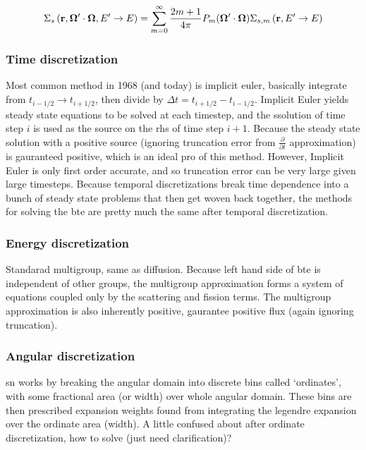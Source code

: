 \begin{equation}
    \label{eq:sigmas_expansion}
    \Sigma_{s}\left(\mathbf{r}, \bm{\Omega}'\cdot\bm{\Omega},E'\rightarrow E\right) = 
    \sum_{m=0}^{\infty}\frac{2m + 1}{4\pi}P_m(\bm{\Omega}'\cdot\bm{\Omega})\Sigma_{s,m}\left(\mathbf{r},E'\rightarrow E\right)
\end{equation}

\subsubsection{Time discretization}
Most common method in 1968 (and today) is implicit euler, basically integrate from $t_{i-1/2} \rightarrow t_{i+1/2}$, then divide by $\Delta t = t_{i+1/2} - t_{i-1/2}$. Implicit Euler yields steady state equations to be solved at each timestep, and the ssolution of time step $i$ is used as the source on the rhs of time step $i+1$. Because the steady state solution with a positive source (ignoring truncation error from $\frac{\partial}{\partial t}$ approximation) is gauranteed positive, which is an ideal pro of this method. However, Implicit Euler is only first order accurate, and so truncation error can be very large given large timesteps. Because temporal discretizations break time dependence into a bunch of steady state problems that then get woven back together, the methods for solving the \gls{bte} are pretty much the same after temporal discretization. 

\subsubsection{Energy discretization}
Standarad multigroup, same as diffusion. Because left hand side of \gls{bte} is independent of other groups, the multigroup approximation forms a system of equations coupled only by the scattering and fission terms. The multigroup approximation is also inherently positive, gaurantee positive flux (again ignoring truncation).

\subsubsection{Angular discretization}
\gls{sn} works by breaking the angular domain into discrete bins called `ordinates', with some fractional area (or width) over whole angular domain. These bins are then prescribed expansion weights found from integrating the legendre expansion over the ordinate area (width). A little confused about after ordinate discretization, how to solve (just need clarification)? 

